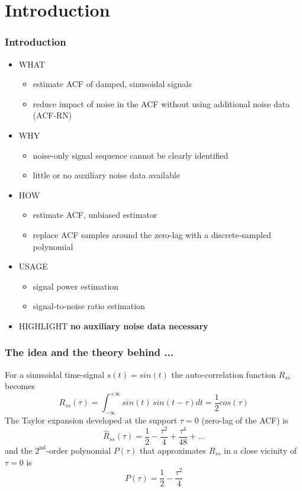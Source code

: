 \documentclass[11pt,aspectratio=169]{beamer}
\begin{document}
	\section{Introduction}
	\begin{frame}
		\frametitle{Introduction}
		\begin{itemize}
			\item \textcolor{RIPtitlecol}{WHAT}
			\begin{itemize}
				\item estimate ACF of damped, sinusoidal signals
				\item reduce impact of noise in the ACF without using additional noise data (ACF-RN)
			\end{itemize}
			\item \textcolor{RIPtitlecol}{WHY}
			\begin{itemize}
				\item noise-only signal sequence cannot be clearly identified
				\item little or no auxiliary noise data available
			\end{itemize}
			\item \textcolor{RIPtitlecol}{HOW}
			\begin{itemize}
				\item estimate ACF, unbiased estimator
				\item replace ACF samples around the zero-lag with a discrete-sampled polynomial
			\end{itemize}
			\item \textcolor{RIPtitlecol}{USAGE}
				\begin{itemize}
					\item signal power estimation
					\item signal-to-noise ratio estimation
				\end{itemize}
			\item \textcolor{RIPtitlecol}{HIGHLIGHT} \textbf{no auxiliary noise data necessary}
		\end{itemize}
	\end{frame}
	\begin{frame}
		\frametitle{The idea and the theory behind ...}
		For a sinusoidal time-signal $s(t) = sin(t)$ the auto-correlation function $R_{ss}$ becomes
		\begin{equation}
			R_{ss}(\tau) = \int_{-\infty}^{+\infty} sin(t)\,sin(t-\tau) dt = \frac{1}{2} cos(\tau)
		\end{equation}
		The Taylor expansion developed at the support $\tau = 0$ (zero-lag of the ACF) is
		\begin{equation}
			\hat{R}_{ss}(\tau) = \frac{1}{2}-\frac{{{\tau}^{2}}}{4}+\frac{{{\tau}^{4}}}{48}+\ldots
		\end{equation}
		and the $2^{\text{nd}}$-order polynomial $P(\tau)$ that approximates $R_{ss}$ in a close vicinity of $\tau = 0$ is
		\begin{equation}
			P(\tau) = \frac{1}{2}-\frac{{{\tau}^{2}}}{4}
		\end{equation}
	\end{frame}
\end{document}
